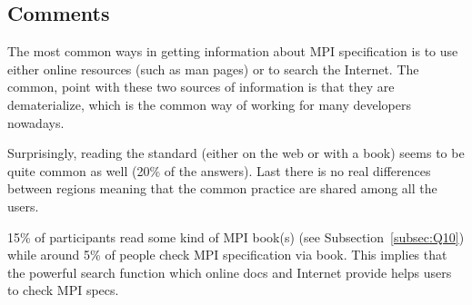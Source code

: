 \subsection{Comments}
The most common ways in getting information about MPI specification is to use
either online resources (such as man pages) or to search the Internet. The
common, point with these two sources of information is that they are
dematerialize, which is the common way of working for many developers nowadays.   


Surprisingly, reading the standard (either on the web or with a book) seems to
be quite common as well (20\% of the answers). Last there is no real differences
between regions meaning that the common practice are shared among all the
users. 


15\% of participants read some kind of MPI book(s) (see
Subsection~\ref{subsec:Q10}) while around 5\% of people check MPI
specification via book. This implies that the powerful search function
which online docs and Internet provide helps users to check MPI specs.
